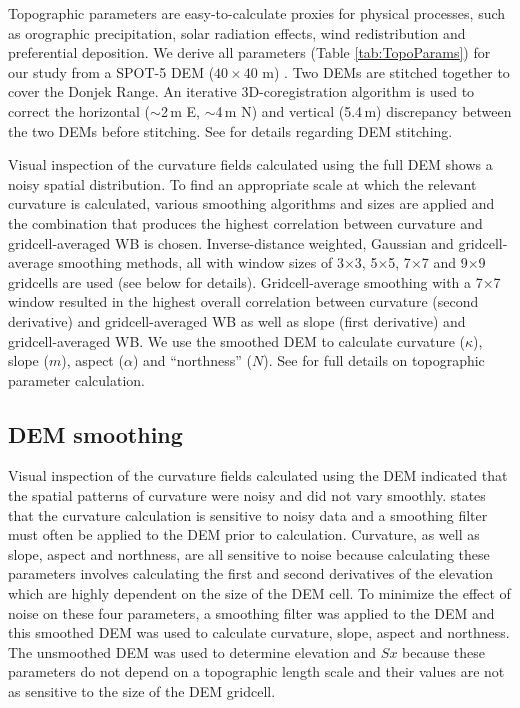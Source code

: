 \documentclass[onecolumn, letterpaper]{igs}
\begin{document}
Topographic parameters are easy-to-calculate proxies for physical processes, such as orographic precipitation, solar radiation effects, wind redistribution and preferential deposition. We derive all parameters (Table \ref{tab:TopoParams}) for our study from a SPOT-5 DEM ($40\times40$ m) \citep{Korona2009}. Two DEMs are stitched together to cover the Donjek Range. An iterative 3D-coregistration algorithm \citep{Berthier2007} is used to correct the horizontal ($\sim$2\,m E, $\sim$4\,m N) and vertical (5.4\,m) discrepancy between the two DEMs before stitching. See \cite{Pulwicki2017} for details regarding DEM stitching.

Visual inspection of the curvature fields calculated using the full DEM shows a noisy spatial distribution. To find an appropriate scale at which the relevant curvature is calculated, various smoothing algorithms and sizes are applied and the combination that produces the highest correlation between curvature and gridcell-averaged WB is chosen. Inverse-distance weighted, Gaussian and gridcell-average smoothing methods, all with window sizes of 3$\times$3, 5$\times$5, 7$\times$7 and 9$\times$9 gridcells are used (see below for details). Gridcell-average smoothing with a 7$\times$7 window resulted in the highest overall correlation between curvature (second derivative) and gridcell-averaged WB as well as slope (first derivative) and gridcell-averaged WB. We use the smoothed DEM to calculate curvature ($\kappa$), slope ($m$), aspect ($\alpha$) and ``northness'' ($N$). See \cite{Pulwicki2017} for full details on topographic parameter calculation.

\subsection*{DEM smoothing}

Visual inspection of the curvature fields calculated using the DEM indicated that the spatial patterns of curvature were noisy and did not vary smoothly. \cite{Olaya2009} states that the curvature calculation is sensitive to noisy data and a smoothing filter must often be applied to the DEM prior to calculation. Curvature, as well as slope, aspect and northness, are all sensitive to noise because calculating these parameters involves calculating the first and second derivatives of the elevation which are highly dependent on the size of the DEM cell. To minimize the effect of noise on these four parameters, a smoothing filter was applied to the DEM and this smoothed DEM was used to calculate curvature, slope, aspect and northness. The unsmoothed DEM was used to determine elevation and $Sx$ because these parameters do not depend on a topographic length scale and their values are not as sensitive to the size of the DEM gridcell.
\end{document}
